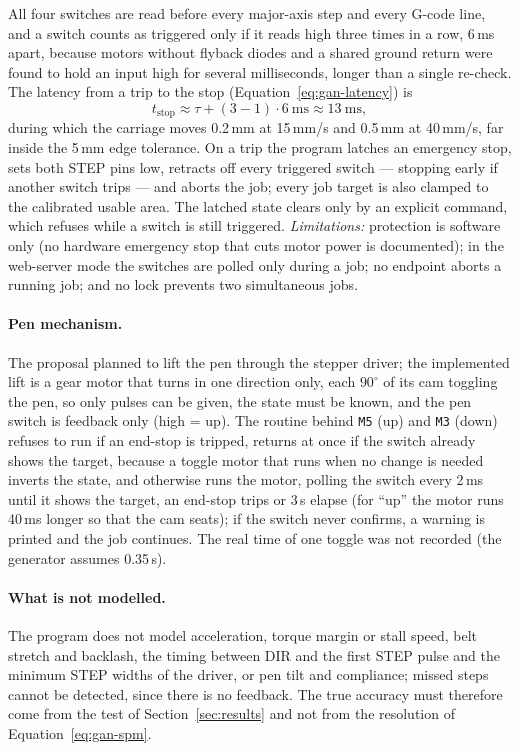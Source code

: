 All four switches are read before every major-axis step and every G-code line, and a switch counts as triggered only if it reads high three times in a row, 6\,ms apart, because motors without flyback diodes and a shared ground return were found to hold an input high for several milliseconds, longer than a single re-check.
The latency from a trip to the stop (Equation~\ref{eq:gan-latency}) is
\begin{equation}
t_{\mathrm{stop}}\approx\tau+(3-1)\cdot6\ \mathrm{ms}\approx13\ \mathrm{ms},
\label{eq:gan-latency}
\end{equation}
during which the carriage moves 0.2\,mm at 15\,mm/s and 0.5\,mm at 40\,mm/s, far inside the 5\,mm edge tolerance.
On a trip the program latches an emergency stop, sets both STEP pins low, retracts off every triggered switch --- stopping early if another switch trips --- and aborts the job; every job target is also clamped to the calibrated usable area.
The latched state clears only by an explicit command, which refuses while a switch is still triggered.
\emph{Limitations:} protection is software only (no hardware emergency stop that cuts motor power is documented); in the web-server mode the switches are polled only during a job; no endpoint aborts a running job; and no lock prevents two simultaneous jobs.

\paragraph{Pen mechanism.}
\label{sec:gan-pen}
The proposal planned to lift the pen through the stepper driver; the implemented lift is a gear motor that turns in one direction only, each $90^\circ$ of its cam toggling the pen, so only pulses can be given, the state must be known, and the pen switch is feedback only (high = up).
The routine behind \texttt{M5} (up) and \texttt{M3} (down) refuses to run if an end-stop is tripped, returns at once if the switch already shows the target, because a toggle motor that runs when no change is needed inverts the state, and otherwise runs the motor, polling the switch every 2\,ms until it shows the target, an end-stop trips or 3\,s elapse (for ``up'' the motor runs 40\,ms longer so that the cam seats); if the switch never confirms, a warning is printed and the job continues.
The real time of one toggle was not recorded (the generator assumes 0.35\,s).

\paragraph{What is not modelled.}
The program does not model acceleration, torque margin or stall speed, belt stretch and backlash, the timing between DIR and the first STEP pulse and the minimum STEP widths of the driver, or pen tilt and compliance; missed steps cannot be detected, since there is no feedback.
The true accuracy must therefore come from the test of Section~\ref{sec:results} and not from the resolution of Equation~\ref{eq:gan-spm}.
